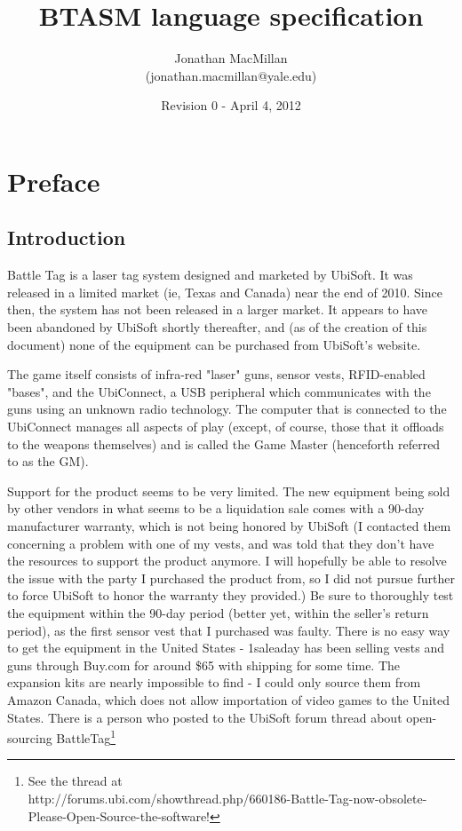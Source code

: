 \documentclass[12pt,a4paper]{scrbook}
\begin{document}
\title {BTASM language specification}
\date {Revision 0 - April 4, 2012}
\author {Jonathan MacMillan \\(jonathan.macmillan@yale.edu)}
\maketitle

\frontmatter
\setcounter{page}{1}
\tableofcontents


\chapter*{Preface}
\pagestyle{scrheadings}
\rohead{\thepage}
\lehead{\thepage}
\cfoot{}
\ofoot{}
\section*{Introduction}

Battle Tag is a laser tag system designed and marketed by UbiSoft.  It was released in a
limited market (ie, Texas and Canada) near the end of 2010.  Since then, the system has
not been released in a larger market.  It appears to have been abandoned by UbiSoft shortly
thereafter, and (as of the creation of this document) none of the equipment can be purchased
from UbiSoft's website.

The game itself consists of infra-red "laser" guns, sensor vests, RFID-enabled "bases", and
the UbiConnect, a USB peripheral which communicates with the guns using an unknown radio
technology.  The computer that is connected to the UbiConnect manages all aspects of play 
(except, of course, those that it offloads to the weapons themselves) and is called the Game
Master (henceforth referred to as the GM).

Support for the product seems to be very limited.  The new equipment being sold by other
vendors in what seems to be a liquidation sale comes with a 90-day manufacturer warranty, 
which is not being honored by UbiSoft (I contacted them concerning a problem with one of my vests, 
and was told that they don't have the resources to support the product anymore.  I will hopefully be
able to resolve the issue with the party I purchased the product from, so I did not pursue further to
force UbiSoft to honor the warranty they provided.)  Be sure to thoroughly test the
equipment within the 90-day period (better yet, within the seller's return period), as the first
 sensor vest that I purchased was faulty.
There is no easy way to get the equipment in the United States - 1saleaday has been selling
vests and guns through Buy.com  for around \$65 with shipping for some time.  The expansion kits are
 nearly impossible to find - I could only source them from Amazon Canada, which does not allow 
 importation of video games to the United States.  There is a person who posted to the UbiSoft forum
 thread about open-sourcing BattleTag\footnote{See the thread at \\
 http://forums.ubi.com/showthread.php/660186-Battle-Tag-now-obsolete-Please-Open-Source-the-software!}
\end{document}
